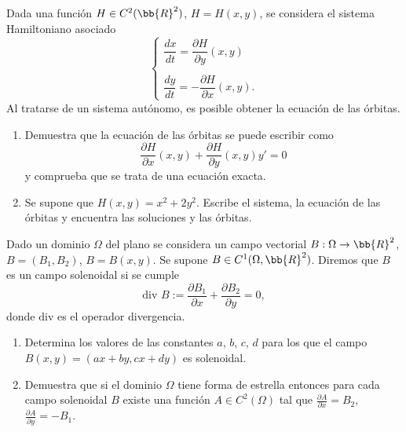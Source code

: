\begin{ejercicio}
    Dada una función $H \in C^2(\bb{R}^2)$, $H = H(x, y)$, se considera el sistema Hamiltoniano asociado
    \[
        \begin{cases}
            \dfrac{dx}{dt} = \dfrac{\partial H}{\partial y}(x, y) \\ \\
            \dfrac{dy}{dt} = -\dfrac{\partial H}{\partial x}(x, y).
        \end{cases}
    \]
    Al tratarse de un sistema autónomo, es posible obtener la ecuación de las órbitas.
    \begin{enumerate}
        \item Demuestra que la ecuación de las órbitas se puede escribir como
        \[
            \frac{\partial H}{\partial x}(x, y) + \frac{\partial H}{\partial y}(x, y)y' = 0
        \]
        y comprueba que se trata de una ecuación exacta.
        \item Se supone que $H(x, y) = x^2 + 2y^2$. Escribe el sistema, la ecuación de las órbitas y encuentra las soluciones y
        las órbitas.
    \end{enumerate}
\end{ejercicio}

\begin{ejercicio}
    Dado un dominio $\Omega$ del plano se considera un campo vectorial $B : \Omega \to \bb{R}^2$, $B = (B_1, B_2)$, $B = B(x, y)$. Se supone
    $B \in C^1(\Omega, \bb{R}^2)$. Diremos que $B$ es un campo solenoidal si se cumple
    \[
        \text{div } B := \frac{\partial B_1}{\partial x} + \frac{\partial B_2}{\partial y} = 0,
    \]
    donde $\text{div}$ es el operador divergencia.
    \begin{enumerate}
        \item Determina los valores de las constantes $a$, $b$, $c$, $d$ para los que el campo $B(x, y) = (ax+by, cx+dy)$ es solenoidal.
        \item Demuestra que si el dominio $\Omega$ tiene forma de estrella entonces para cada campo solenoidal $B$ existe una
        función $A \in C^2(\Omega)$ tal que $\frac{\partial A}{\partial x} = B_2$, $\frac{\partial A}{\partial y} = -B_1$.
    \end{enumerate}
\end{ejercicio}


